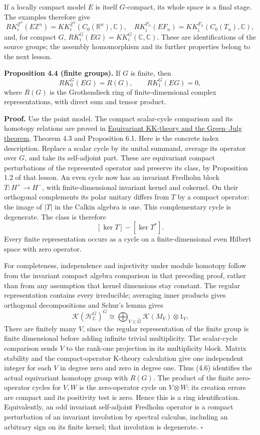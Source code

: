 \documentclass[
  11pt,
]{article}
\begin{document}
If a locally compact model \(E\) is itself \(G\)-compact, its whole
space is a final stage. The examples therefore give \[
 RK_i^{\mathbb Z^n}(E\mathbb Z^n)=KK_i^{\mathbb Z^n}(C_0(\mathbb R^n),\mathbb C),
 \quad RK_i^{F_n}(EF_n)=KK_i^{F_n}(C_0(T_n),\mathbb C),
 \tag{4.4}
\] and, for compact \(G\), \(RK_i^G(EG)=KK_i^G(\mathbb C,\mathbb C)\).
These are identifications of the source groups; the assembly
homomorphism and its further properties belong to the next lesson.

\textbf{Proposition 4.4 (finite groups).} If \(G\) is finite, then \[
                         RK_0^G(EG)=R(G),\qquad RK_1^G(EG)=0,
 \tag{4.5}
\] where \(R(G)\) is the Grothendieck ring of finite-dimensional complex
representations, with direct sum and tensor product.

\textbf{Proof.} Use the point model. The compact scalar-cycle comparison
and its homotopy relations are proved in
\href{KT-KK-17.html}{Equivariant KK-theory and the Green--Julg theorem},
Theorem 4.3 and Proposition 6.1. Here is the concrete index description.
Replace a scalar cycle by its unital summand, average its operator over
\(G\), and take its self-adjoint part. These are equivariant compact
perturbations of the represented operator and preserve its class, by
Proposition 1.2 of that lesson. An even cycle now has an invariant
Fredholm block \(T:H^+\to H^-\), with finite-dimensional invariant
kernel and cokernel. On their orthogonal complements its polar unitary
differs from \(T\) by a compact operator: the image of \(|T|\) in the
Calkin algebra is one. This complementary cycle is degenerate. The class
is therefore \[
                              [\ker T]-[\ker T^*].
 \tag{4.6}
\] Every finite representation occurs as a cycle on a finite-dimensional
even Hilbert space with zero operator.

For completeness, independence and injectivity under module homotopy
follow from the invariant compact algebra comparison in that preceding
proof, rather than from any assumption that kernel dimensions stay
constant. The regular representation contains every irreducible;
averaging inner products gives orthogonal decompositions and Schur's
lemma gives \[
        \mathcal K(\mathcal H_{\mathbb C}^G)^G
         \cong\bigoplus_{V\in\widehat G}\mathcal K(M_V)\otimes1_V.
 \tag{4.7}
\] There are finitely many \(V\), since the regular representation of
the finite group is finite dimensional before adding infinite trivial
multiplicity. The scalar-cycle comparison sends \(V\) to the rank-one
projection in its multiplicity block. Matrix stability and the
compact-operator K-theory calculation give one independent integer for
each \(V\) in degree zero and zero in degree one. Thus (4.6) identifies
the actual equivariant homotopy group with \(R(G)\). The product of the
finite zero-operator cycles for \(V,W\) is the zero-operator cycle on
\(V\otimes W\): its creation errors are compact and its positivity test
is zero. Hence this is a ring identification. Equivalently, an odd
invariant self-adjoint Fredholm operator is a compact perturbation of an
invariant involution by spectral calculus, including an arbitrary sign
on its finite kernel; that involution is degenerate. \(\square\)
\end{document}
